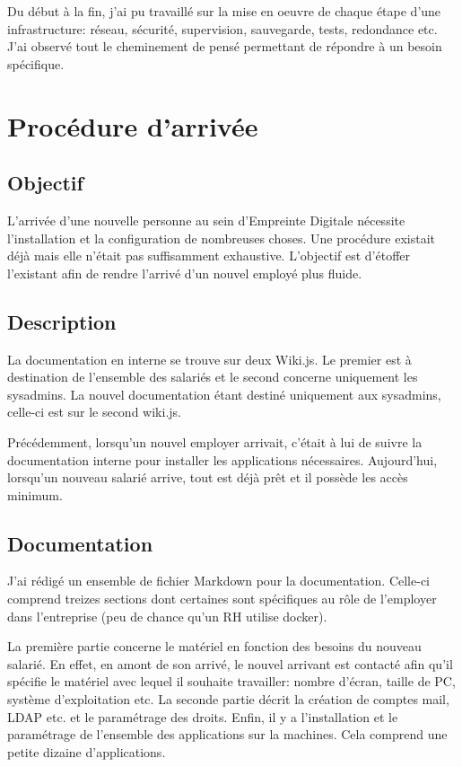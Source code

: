 \documentclass[12pt, a4paper, twoside]{article}
\begin{document}
Du début à la fin, j'ai pu travaillé sur la mise en oeuvre de chaque étape d'une infrastructure: réseau, sécurité, supervision, sauvegarde, tests, redondance etc.
J'ai observé tout le cheminement de pensé permettant de répondre à un besoin spécifique.



\newpage
\section{Procédure d'arrivée}
\subsection{Objectif}
L'arrivée d'une nouvelle personne au sein d'Empreinte Digitale nécessite l'installation et la configuration de nombreuses choses.
Une procédure existait déjà mais elle n'était pas suffisamment exhaustive.
L'objectif est d'étoffer l'existant afin de rendre l'arrivé d'un nouvel employé plus fluide.

\subsection{Description}
La documentation en interne se trouve sur deux Wiki.js.
Le premier est à destination de l'ensemble des salariés et le second concerne uniquement les sysadmins.
La nouvel documentation étant destiné uniquement aux sysadmins, celle-ci est sur le second wiki.js.

Précédemment, lorsqu'un nouvel employer arrivait, c'était à lui de suivre la documentation interne pour installer les applications nécessaires.
Aujourd'hui, lorsqu'un nouveau salarié arrive, tout est déjà prêt et il possède les accès minimum. 

\subsection{Documentation}
J'ai rédigé un ensemble de fichier \gls{Markdown} pour la documentation. 
Celle-ci comprend treizes sections dont certaines sont spécifiques au rôle de l'employer dans l'entreprise (peu de chance qu'un RH utilise docker).

La première partie concerne le matériel en fonction des besoins du nouveau salarié.
En effet, en amont de son arrivé, le nouvel arrivant est contacté afin qu'il spécifie le matériel avec lequel il souhaite travailler: nombre d'écran, taille de PC, système d'exploitation etc.
La seconde partie décrit la création de comptes mail, \gls{LDAP} etc. et le paramétrage des droits.
Enfin, il y a l'installation et le paramétrage de l'ensemble des applications sur la machines.
Cela comprend une petite dizaine d'applications.
\end{document}
